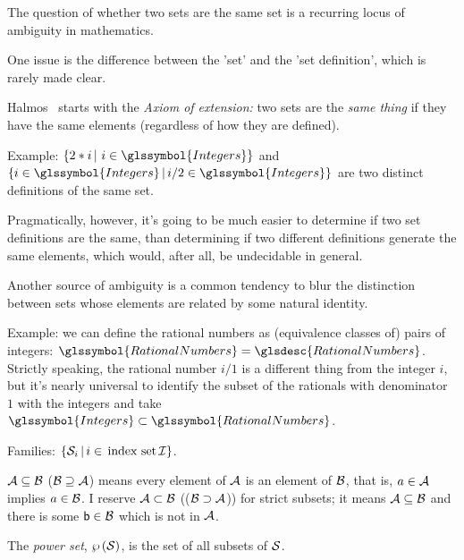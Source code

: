The question of whether two sets are the same set is a recurring
locus of ambiguity in mathematics.

One issue is the difference between the 'set' and the 
'set definition', which is rarely made clear.

Halmos~\cite{Halmos1960Naive} starts with the \emph{Axiom of
extension:} two sets are the \emph{same thing} if they have the
same elements (regardless of how they are defined).

Example: 
$\SetSpec{ 2*i }{ \, i \in \glssymbol{Integers} }$
and
$\SetSpec{ i \in \glssymbol{Integers} }
{ i/2 \in \glssymbol{Integers} }$
are two distinct definitions of the same set. 
 
Pragmatically, however, it's going to be much easier to determine
if two set definitions are the same, than determining if two
different definitions generate the same elements, which would,
after all, be undecidable in general.

Another source of ambiguity is a common tendency to blur the 
distinction between sets whose elements are related by some natural
identity. 

Example: we can define the rational numbers as (equivalence
classes of) pairs of integers:
$\glssymbol{RationalNumbers} = \glsdesc{RationalNumbers}$.
Strictly speaking, the rational number $i/1$ is a different thing
from the integer $i$, but it's nearly universal to identify the
subset of the rationals with denominator $1$ with the integers and
take $\glssymbol{Integers} \subset \glssymbol{RationalNumbers}$.


Families: 
$ \left\{  \mathcal{S}_{i}  \, | \,  i \in \, \text{index set} \, \mathcal{I}  \right\} $.



$\mathcal{A} \subseteq \mathcal{B}$ ($\mathcal{B} \supseteq \mathcal{A}$)
means
every element of $\mathcal{A}$ is an element of $\mathcal{B}$, 
that is, $a \in \mathcal{A}$ 
implies $a \in \mathcal{B}$.
I reserve $\mathcal{A} \subset \mathcal{B}$ (($\mathcal{B} \supset
\mathcal{A}$)) for strict subsets;
it means $\mathcal{A} \subseteq \mathcal{B}$
and there is some $\mathsf{b}\in\mathcal{B}$ which
is not in $\mathcal{A}$.


The \emph{power set}, $ \wp \left( \mathcal{S} \right) $,
 is the set 
of all subsets of
$\mathcal{S}$.

